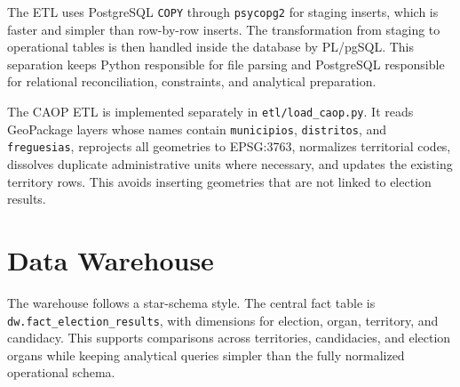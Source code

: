 \documentclass[11pt,twocolumn]{article}
\begin{document}
The ETL uses PostgreSQL \texttt{COPY} through \texttt{psycopg2} for staging inserts, which is faster and simpler than row-by-row inserts. The transformation from staging to operational tables is then handled inside the database by PL/pgSQL. This separation keeps Python responsible for file parsing and PostgreSQL responsible for relational reconciliation, constraints, and analytical preparation.

The CAOP ETL is implemented separately in \texttt{etl/load\_caop.py}. It reads GeoPackage layers whose names contain \texttt{municipios}, \texttt{distritos}, and \texttt{freguesias}, reprojects all geometries to EPSG:3763, normalizes territorial codes, dissolves duplicate administrative units where necessary, and updates the existing territory rows. This avoids inserting geometries that are not linked to election results.

\section{Data Warehouse}

The warehouse follows a star-schema style. The central fact table is \texttt{dw.fact\_election\_results}, with dimensions for election, organ, territory, and candidacy. This supports comparisons across territories, candidacies, and election organs while keeping analytical queries simpler than the fully normalized operational schema.
\end{document}
